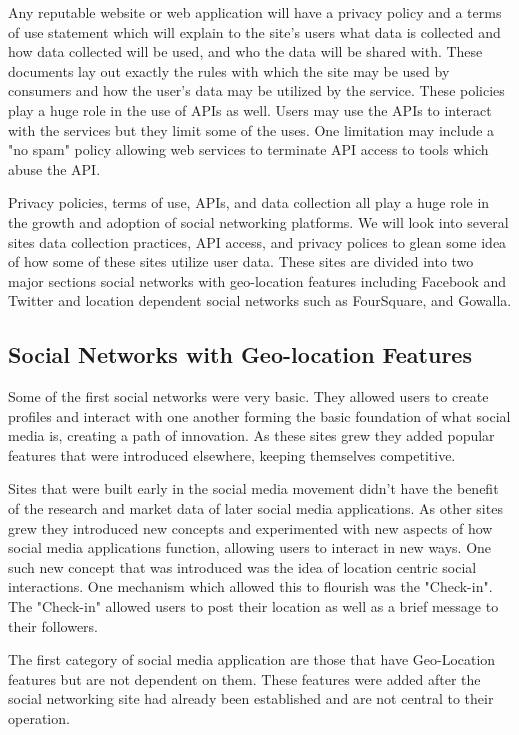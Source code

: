 Any reputable website or web application will have a privacy policy and a terms
of use statement which will explain to the site's users what data is collected
and how data collected will be used,
and who the data will be shared with. These documents lay out exactly the rules
with which the site may be used by consumers and how the user's data may be
utilized by the service. These policies play a huge role in the use of
APIs as well. Users may use the APIs to interact with the services but they
limit some of the uses. One limitation may include a "no spam" policy allowing web
services to terminate API access to tools which abuse the API.

Privacy policies, terms of use, APIs, and data collection all play a huge role
in the growth and adoption of social networking platforms. We will look into
several sites data collection practices, API access, and privacy polices to glean some
idea of how some of these sites utilize user data. These sites are divided into two
major sections social networks with geo-location features including Facebook and
Twitter and location dependent social networks such as FourSquare, and Gowalla.%

\subsection{Social Networks with Geo-location Features}
Some of the first social networks were very basic. They allowed users to create
profiles and interact with one another forming the basic foundation of what
social media is, creating a path of innovation. As these sites grew they added
popular features that were introduced elsewhere, keeping themselves competitive.

Sites that were built early in the social media movement didn't have the benefit
of the research and market data of later social media applications. As other sites grew
they introduced new concepts and experimented with new aspects of how social
media applications function, allowing users to interact in new ways. One such new concept 
that was introduced was the idea of location centric social interactions. One
mechanism which allowed this to flourish was the "Check-in". The "Check-in"
allowed users to post their location as well as a brief message to their
followers.

The first category of social media application are those that have Geo-Location
features but are not dependent on them. These features were added after the
social networking site had already been established and are not central to their
operation.%

